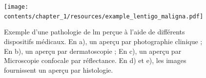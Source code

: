 






\begin{figure}[H]
    \centering
    \texttt{[image: contents/chapter\_1/resources/example\_lentigo\_maligna.pdf]}
    \caption{Exemple d'une pathologie de \gls{lm} perçue à l'aide de différents dispositifs médicaux. En a), un aperçu par photographie clinique ; En b), un aperçu par dermatoscopie ; En c), un aperçu par Microscopie confocale par réflectance. En d) et e), les images fournissent un aperçu par histologie.}
    \label{fig:example_lentigo_maligna}
\end{figure}\par
